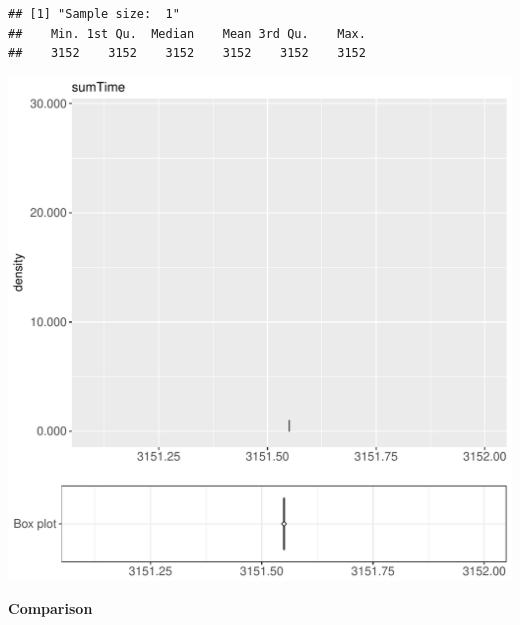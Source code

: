 \documentclass{article}\usepackage[]{graphicx}\usepackage[]{color}
\makeatletter
\def\maxwidth{ %
  \ifdim\Gin@nat@width>\linewidth
    \linewidth
  \else
    \Gin@nat@width
  \fi
}
\newenvironment{kframe}{%
 \def\at@end@of@kframe{}%
 \ifinner\ifhmode%
  \def\at@end@of@kframe{\end{minipage}}%
  \begin{minipage}{\columnwidth}%
 \fi\fi%
 \def\FrameCommand##1{\hskip\@totalleftmargin \hskip-\fboxsep
 \colorbox{shadecolor}{##1}\hskip-\fboxsep
     \hskip-\linewidth \hskip-\@totalleftmargin \hskip\columnwidth}%
 \MakeFramed {\advance\hsize-\width
   \@totalleftmargin\z@ \linewidth\hsize
   \@setminipage}}%
 {\par\unskip\endMakeFramed%
 \at@end@of@kframe}
\newenvironment{knitrout}{}{} %
\makeatother
\begin{document}
\begin{knitrout}
\color{fgcolor}\begin{kframe}
\begin{verbatim}
## [1] "Sample size:  1"
##    Min. 1st Qu.  Median    Mean 3rd Qu.    Max. 
##    3152    3152    3152    3152    3152    3152
\end{verbatim}


{\ttfamily\noindent\bfseries{}}\end{kframe}
\includegraphics[width=\maxwidth]{figure/RH1_nocache_obscure-1} 

\end{knitrout}
  
 \textbf{Comparison}
  
\end{document}
